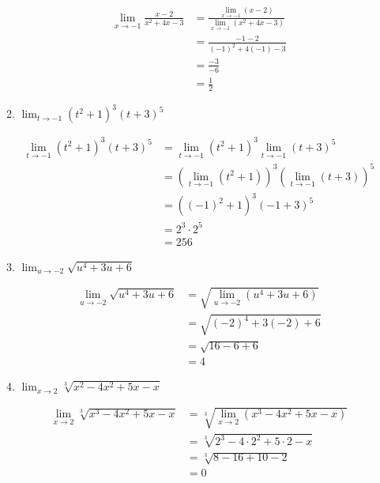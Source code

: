 \documentclass[a4paper, 12pt]{article}
\begin{document}
\begin{enumerate}
\begin{enumerate}
        \begin{align*}
            \lim_{x \to -1}\frac{x-2}{x^2 + 4x - 3} &= \frac{\lim_{x \to -1}(x-2)}{\lim_{x \to -1}(x^2 + 4x - 3)} \tag*{[l. quo.]}\\
            &= \frac{-1 -2}{(-1)^2 + 4(-1) - 3} \tag*{[l. pol.]} \\
            &= \frac{-3}{-6} \\
            &= \frac{1}{2}
        \end{align*}

        \item $\lim_{t \to -1} (t^2 + 1)^3 (t+ 3)^5$
        
        \begin{align*}
            \lim_{t \to -1} (t^2 + 1)^3 (t+ 3)^5 &= \lim_{t \to -1}(t^2 + 1)^3 \lim_{t \to -1} (t+ 3)^5 \tag*{[l. prod.]}\\
            &= \left(\lim_{t \to -1}(t^2 + 1)\right)^3 \left(\lim_{t \to -1}(t+ 3) \right)^5 \tag*{[l. pot.]}\\
            &= ((-1)^2 + 1)^3 (-1 + 3) ^5 \tag*{[l. pol.]}\\
            &= 2^3 \cdot 2^5 \\
            &= 256
        \end{align*}

        \item $\lim_{u \to -2} \sqrt{u^4 + 3u + 6}$
        
        \begin{align*}
            \lim_{u \to -2} \sqrt{u^4 + 3u + 6} &= \sqrt{\lim_{u \to -2}(u^4 + 3u + 6)}\tag*{[l. raíz.]}\\
            &= \sqrt{(-2)^4 + 3(-2) + 6} \tag*{[l. pol.]}\\
            &= \sqrt{16 - 6 + 6} \\
            &= 4
        \end{align*}

        \item $\lim_{x \to 2} \sqrt[3]{x^2 - 4x^2 + 5x - x}$
        
        \begin{align*}
            \lim_{x \to 2} \sqrt[3]{x^3 - 4x^2 + 5x - x} &= \sqrt[3]{\lim_{x \to 2}(x^3 - 4x^2 + 5x - x)}\tag*{[l. raíz.]} \\
            &= \sqrt[3]{2^3 - 4\cdot 2^2 + 5\cdot 2 - x} \tag*{[l. pol.]}\\
            &= \sqrt[3]{8 - 16 + 10 - 2}\\
            &= 0
        \end{align*}


\end{enumerate}
\end{enumerate}
\end{document}
